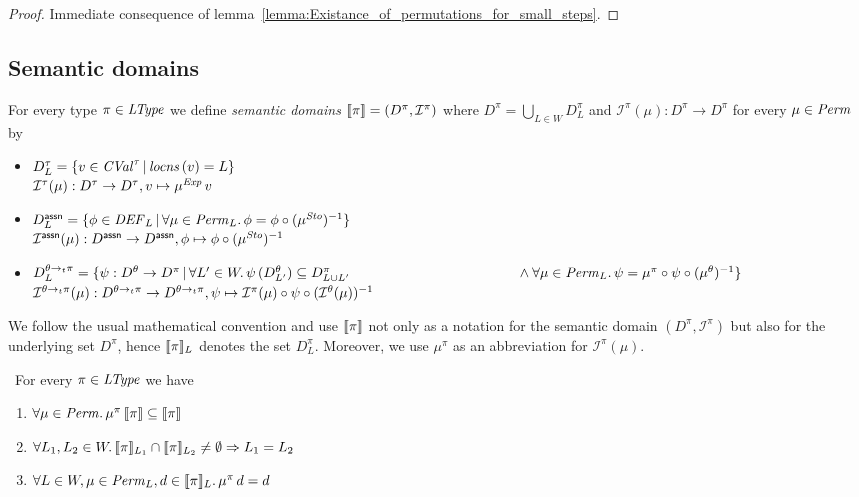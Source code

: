 \documentclass[12pt,a4paper]{report}
\newcommand{\CVal}{\nstyle{CVal}}
\newcommand{\Sto}{\nstyle{Sto}}
\newcommand{\DEF}{\nstyle{DEF}}
\newcommand{\I}{\mathcal{I}}
\begin{document}
\begin{proof}
  Immediate consequence of lemma~\ref{lemma:Existance_of_permutations_for_small_steps}.
\end{proof}



\subsection{Semantic domains}

\begin{definition}
  For every type $\pi\in\mathit{LType}$ we define {\em semantic domains} $\semantic{\pi} = (D^\pi,\I^\pi)$ where
  $D^\pi = \bigcup_{L \in W} D^\pi_L$ and $\I^\pi(\mu) : D^\pi \to D^\pi$ for every $\mu \in \mathit{Perm}$ by
  \begin{itemize}
    \item $D^\tau_L = \{v\in\CVal^\tau\,|\,\locns{v} = L\}$ \\
          $\I^\tau(\mu): D^\tau \to D^\tau, v \mapsto \mu^\Exp\,v$

    \item $D^\tassn_L = \{ \phi\in\DEF_L\,|\,\forall \mu\in\Perm_L.\,\phi = \phi \circ (\mu^\Sto)^{-1}\}$ \\
          $\I^\tassn(\mu): D^\tassn \to D^\tassn, \phi \mapsto \phi \circ (\mu^\Sto)^{-1}$

    \item $D^{\ttarrow{\theta}{\pi}}_L = \{ \psi: D^\theta \to D^\pi\,|\,
                          \forall L'\in W.\,\psi\,(D^\theta_{L'}) \subseteq D^\pi_{L \cup L'} \\
                          \hspace*{4.2cm} \wedge \forall \mu\in\Perm_L.\,\psi=\mu^\pi\circ\psi\circ(\mu^\theta)^{-1}\}$\\
          $\I^{\ttarrow{\theta}{\pi}}(\mu): D^{\ttarrow{\theta}{\pi}} \to D^{\ttarrow{\theta}{\pi}},
                                            \psi \mapsto \I^\pi(\mu) \circ \psi \circ (\I^\theta(\mu))^{-1}$
  \end{itemize}
\end{definition}

We follow the usual mathematical convention and use $\llbracket\pi\rrbracket$ not only as a notation
for the semantic domain $(D^\pi,\I^\pi)$ but also for the underlying set $D^\pi$,
hence $\llbracket\pi\rrbracket_L$ denotes the set $D^\pi_L$. Moreover, we use $\mu^\pi$ as an abbreviation
for $\I^\pi(\mu)$.

\begin{lemma} \
  For every $\pi \in \mathit{LType}$ we have
  \begin{enumerate}
    \item $\forall \mu \in \mathit{Perm}.\,\mu^\pi\,\llbracket\pi\rrbracket \subseteq \llbracket\pi\rrbracket$
    \item $\forall L_1,L_2 \in W.\, \llbracket\pi\rrbracket_{L_1} \cap \llbracket\pi\rrbracket_{L_2} \ne \emptyset \Rightarrow L_1=L_2$
    \item $\forall L \in W, \mu \in \mathit{Perm}_L, d\in \llbracket\pi\rrbracket_L.\, \mu^\pi\,d = d$
  \end{enumerate}
\end{lemma}
\end{document}
